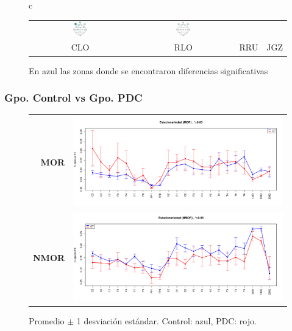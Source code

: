 \documentclass{beamer}
\begin{document}
\begin{frame}
\begin{figure}
\begin{tabular}{c}
\begin{tabular}{cccc}
\includegraphics[width=0.15\textwidth]{./img_diagramas/cabecita_RRU.pdf} &
\includegraphics[width=0.15\textwidth]{./img_diagramas/cabecita_JGZ.pdf} \\
CLO & RLO & RRU & JGZ
\end{tabular}
\end{tabular}
\caption{En azul las zonas donde se encontraron diferencias significativas}
\end{figure}
\end{frame}


\begin{frame}\frametitle{Gpo. Control vs Gpo. PDC}
\begin{figure}
\centering
\begin{tabular}{rl}
{\Large \textbf{MOR}}
&
\includegraphics[width=0.6\linewidth]
{./img_ejemplos/Comparacion_gpos_MOR.pdf} 
\\
{\Large \textbf{NMOR}}
&
\includegraphics[width=0.6\linewidth]
{./img_ejemplos/Comparacion_gpos_NMOR.pdf} 
\end{tabular}
\caption{ Promedio $\pm$ 1 desviaci\'on est\'andar. Control: azul, PDC: rojo.}
\end{figure}
\end{frame}
\end{document}
